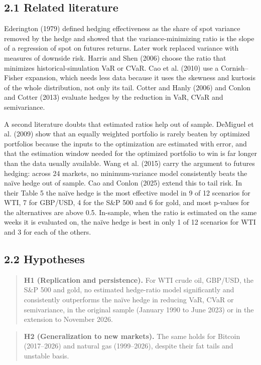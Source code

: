 \documentclass[11pt,letterpaper]{article}
\begin{document}
\subsection*{2.1 Related literature}

Ederington (1979) defined hedging effectiveness as the share of spot variance removed by the hedge and showed that the variance-minimizing ratio is the slope of a regression of spot on futures returns. Later work replaced variance with measures of downside risk. Harris and Shen (2006) choose the ratio that minimizes historical-simulation VaR or CVaR. Cao et al. (2010) use a Cornish–Fisher expansion, which needs less data because it uses the skewness and kurtosis of the whole distribution, not only its tail. Cotter and Hanly (2006) and Conlon and Cotter (2013) evaluate hedges by the reduction in VaR, CVaR and semivariance.

A second literature doubts that estimated ratios help out of sample. DeMiguel et al. (2009) show that an equally weighted portfolio is rarely beaten by optimized portfolios because the inputs to the optimization are estimated with error, and that the estimation window needed for the optimized portfolio to win is far longer than the data usually available. Wang et al. (2015) carry the argument to futures hedging: across 24 markets, no minimum-variance model consistently beats the naïve hedge out of sample. Cao and Conlon (2025) extend this to tail risk. In their Table 5 the naïve hedge is the most effective model in 9 of 12 scenarios for WTI, 7 for GBP/USD, 4 for the S\&P 500 and 6 for gold, and most p-values for the alternatives are above 0.5. In-sample, when the ratio is estimated on the same weeks it is evaluated on, the naïve hedge is best in only 1 of 12 scenarios for WTI and 3 for each of the others.

\subsection*{2.2 Hypotheses}

\begin{quote}
\textbf{H1 (Replication and persistence).} For WTI crude oil, GBP/USD, the S\&P 500 and gold, no estimated hedge-ratio model significantly and consistently outperforms the naïve hedge in reducing VaR, CVaR or semivariance, in the original sample (January 1990 to June 2023) or in the extension to November 2026.
\end{quote}

\begin{quote}
\textbf{H2 (Generalization to new markets).} The same holds for Bitcoin (2017–2026) and natural gas (1999–2026), despite their fat tails and unstable basis.
\end{quote}
\end{document}
